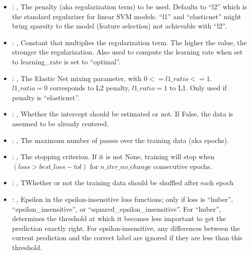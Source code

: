 \begin{itemize}
    \item {}: \xmlDesc{[l2, l1, elasticnet]}, 
      The penalty (aka regularization term) to be used. Defaults to ``l2'' which is the standard
      regularizer for linear SVM models.                                                  ``l1'' and
      ``elasticnet'' might bring sparsity to the model (feature selection) not achievable with
      ``l2''.

    \item {}: , 
      Constant that multiplies the regularization term. The higher the value, the stronger the
      regularization. Also used to compute                                                  the
      learning rate when set to learning\_rate is set to ``optimal''.

    \item {}: , 
      The Elastic Net mixing parameter, with $0 <= l1\_ratio <= 1$. $l1\_ratio=0$ corresponds to L2
      penalty, $l1\_ratio=1$ to L1.                                                  Only used if
      penalty is ``elasticnet''.

    \item {}: , 
      Whether the intercept should be estimated or not. If False,
      the data is assumed to be already centered.

    \item {}: , 
      The maximum number of passes over the training data (aka epochs).

    \item {}: , 
      The stopping criterion. If it is not None, training will stop when $(loss > best\_loss - tol)$
      for $n\_iter\_no\_change$                                                  consecutive epochs.

    \item {}: , 
      TWhether or not the training data should be shuffled after each epoch

    \item {}: , 
      Epsilon in the epsilon-insensitive loss functions; only if loss is ``huber'',
      ``epsilon\_insensitive'', or
      ``squared\_epsilon\_insensitive''. For ``huber'', determines the threshold at which it becomes
      less important to get the                                                  prediction exactly
      right. For epsilon-insensitive, any differences between the current prediction and the correct
      label                                                  are ignored if they are less than this
      threshold.


\end{itemize}
